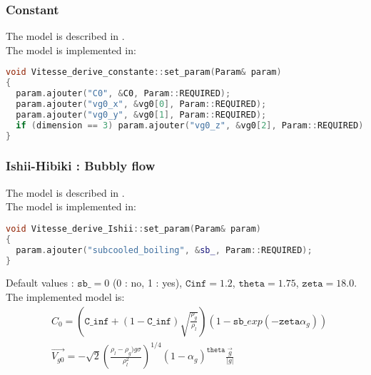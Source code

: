 \subsubsection{Constant}
The model is described in \textcite{ishii1977one}.\\
The model is implemented in:
\begin{lstlisting}[language=c++]
void Vitesse_derive_constante::set_param(Param& param)
{
  param.ajouter("C0", &C0, Param::REQUIRED);
  param.ajouter("vg0_x", &vg0[0], Param::REQUIRED);
  param.ajouter("vg0_y", &vg0[1], Param::REQUIRED);
  if (dimension == 3) param.ajouter("vg0_z", &vg0[2], Param::REQUIRED);
}
\end{lstlisting}

\subsubsection{Ishii-Hibiki : Bubbly flow}
The model is described in \textcite{HIBIKI2002707}.\\
The model is implemented in:
\begin{lstlisting}[language=c++]
void Vitesse_derive_Ishii::set_param(Param& param)
{
  param.ajouter("subcooled_boiling", &sb_, Param::REQUIRED);
}
\end{lstlisting}
Default values :  $\texttt{sb\_} = 0$ (0 : no, 1 : yes),  $\texttt{Cinf} = 1.2$, $\texttt{theta} = 1.75$, $\texttt{zeta} = 18.0$.\\
The implemented model is:
\begin{align}
  & C_0=(\texttt{C_{inf}}+(1-\texttt{C_{inf}})\sqrt{\frac{\rho_g}{\rho_l}})(1-\texttt{sb\_} exp(-\texttt{zeta}\alpha_g))\\
  & \vec{V_{g0}} =-\sqrt{2}(\frac{\rho_l-\rho_g)g\sigma}{\rho_l^2})^{1/4}(1-\alpha_g)^{\texttt{theta}} \frac{\vec{g}}{|g|}
\end{align}

